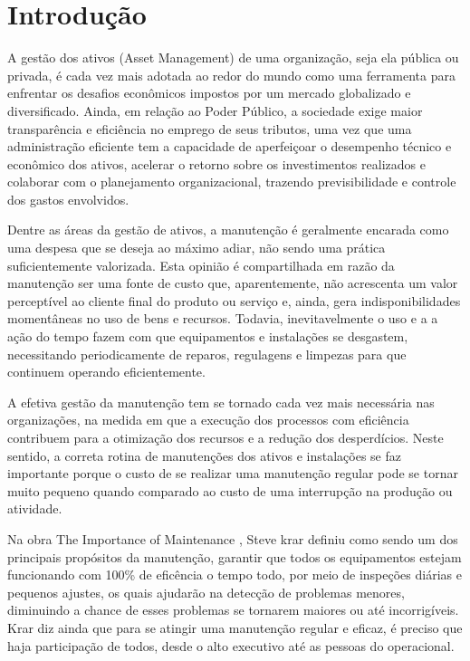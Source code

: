 \chapter{Introdução}
\label{cap-introducao}

A gestão dos ativos (Asset Management) de uma organização, seja ela pública ou privada, é cada vez mais adotada ao redor do mundo como uma ferramenta para enfrentar os desafios econômicos impostos por um mercado globalizado e diversificado. Ainda, em relação ao Poder Público, a sociedade exige maior transparência e eficiência no emprego de seus tributos, uma vez que uma administração eficiente tem a capacidade de aperfeiçoar o desempenho técnico e econômico dos ativos, acelerar o retorno sobre os investimentos realizados e colaborar com o planejamento organizacional, trazendo previsibilidade e controle dos gastos envolvidos. 

Dentre as áreas da gestão de ativos, a manutenção é geralmente encarada como uma despesa que se deseja ao máximo adiar, não sendo uma prática suficientemente valorizada. Esta opinião é compartilhada em razão da manutenção ser uma fonte de custo que, aparentemente, não acrescenta um valor perceptível ao cliente final do produto ou serviço e, ainda, gera indisponibilidades momentâneas no uso de bens e recursos. Todavia, inevitavelmente o uso e a a ação do tempo fazem com que equipamentos e instalações se desgastem, necessitando periodicamente de reparos, regulagens e limpezas para que continuem operando eficientemente.

A efetiva gestão da manutenção tem se tornado cada vez mais necessária nas organizações, na medida em que a execução dos processos com eficiência contribuem para a otimização dos recursos e a redução dos desperdícios.  Neste sentido, a correta rotina de manutenções dos ativos e instalações se faz importante porque o custo de se realizar uma manutenção regular pode se tornar muito pequeno quando comparado ao custo de uma interrupção na produção ou atividade.

Na obra The Importance of Maintenance , Steve krar \cite{krar2009} definiu como sendo um dos principais propósitos da manutenção, garantir que todos os equipamentos estejam funcionando com 100\% de eficência o tempo todo, por meio de inspeções diárias e pequenos ajustes, os quais ajudarão na detecção de problemas menores, diminuindo a chance de esses problemas se tornarem maiores ou até incorrigíveis. Krar diz ainda que para se atingir uma manutenção regular e eficaz, é preciso que haja participação de todos, desde o alto executivo até as pessoas do operacional.

